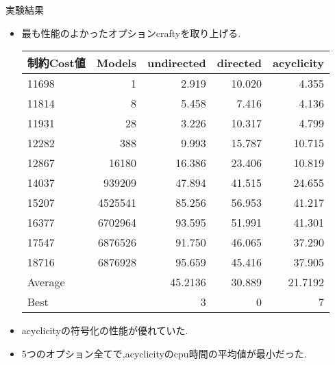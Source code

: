 \documentclass[dvipdfmx,11pt]{beamer}
\begin{document}
\begin{frame}{実験結果}
  \begin{itemize}
  \item 最も性能のよかったオプションcraftyを取り上げる.
\begin{table}
  \begin{tabular}{l|r|rrr}
    \hline
    制約Cost値    &	Models & undirected & directed & acyclicity \\
    \hline
    11698   &	1      &\alert{2.919} &10.020 & 4.355	\\
    11814   &	8      &5.458  &7.416	& \alert{4.136}	\\
    11931   &	28     &\alert{3.226}&10.317	& 4.799	\\
    12282   &	388    &\alert{9.993}&15.787	& 10.715	\\
    12867   &	16180  &16.386       &23.406	& \alert{10.819}\\
    14037   &	939209 &47.894       &41.515	& \alert{24.655}\\
    15207   &	4525541&85.256       &56.953	& \alert{41.217}\\
    16377   &	6702964&93.595       &51.991	& \alert{41.301}	\\
    17547   &	6876526&91.750       &46.065	& \alert{37.290}	\\
    18716   &	6876928&95.659       &45.416	& \alert{37.905}	\\
    \hline
    Average &   & 45.2136 & 30.889  & \alert{21.7192}\\
    Best    &   & 3 & 0 & \alert{7} \\
    \hline
  \end{tabular}
\end{table}
  \item acyclicityの符号化の性能が優れていた.
  \item 5つのオプション全てで,acyclicityのcpu時間の平均値が最小だった.
  \end{itemize}
\end{frame}
\end{document}
